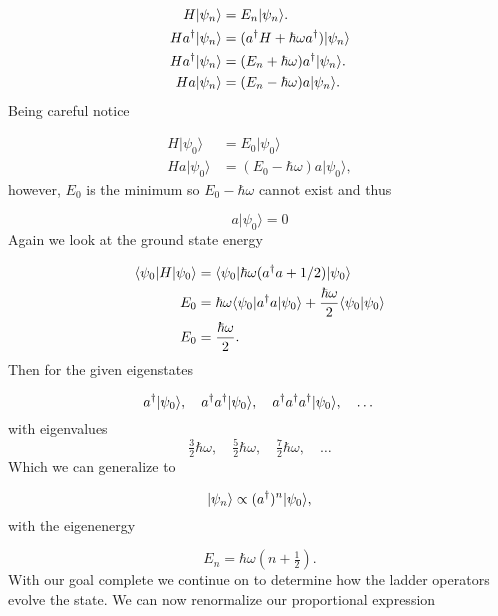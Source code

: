 \begin{align}
  H | \psi_n \rangle &= E_n | \psi_n \rangle. \nonumber \\
  Ha^{\dagger} | \psi_n \rangle &= (a^{\dagger} H + \hbar \omega a^{\dagger}) |\psi_n\rangle \nonumber \\
  Ha^{\dagger} | \psi_n \rangle &= (E_n +\hbar \omega) a^{\dagger} |\psi_n\rangle. \nonumber \\
  H a |\psi_n \rangle &= (E_n - \hbar \omega) a |\psi_n\rangle. \nonumber \\
\end{align}
Being careful notice

\begin{align}
  H|\psi_0\rangle &= E_0 |\psi_0\rangle \nonumber \\
  Ha|\psi_0\rangle &= (E_0-\hbar \omega) a|\psi_0\rangle,
\end{align}
however, $E_0$ is the minimum so $E_0-\hbar \omega$ cannot exist and thus

\begin{equation}
  a |\psi_0\rangle = 0
\end{equation}
Again we look at the ground state energy

\begin{align}
  \langle \psi_0 | H | \psi_0 \rangle &= \langle \psi_0 | \hbar \omega(a^{\dagger} a +1/2) | \psi_0 \rangle \nonumber \\
  E_0 &= \hbar \omega \langle \psi_0 | a^{\dagger} a | \psi_0 \rangle + \dfrac{\hbar\omega}{2} \langle \psi_0 | \psi_0 \rangle \nonumber \\
  E_0 &= \dfrac{\hbar \omega}{2}.
\end{align}
Then for the given eigenstates

\begin{equation*}
  a^{\dagger}|\psi_0\rangle, \quad a^{\dagger}a^{\dagger}|\psi_0\rangle, \quad a^{\dagger}a^{\dagger}a^{\dagger}|\psi_0\rangle, \quad \dots
\end{equation*}
with eigenvalues
\begin{equation*}
  \tfrac{3}{2} \hbar\omega, \quad \tfrac{5}{2} \hbar\omega, \quad \tfrac{7}{2} \hbar\omega, \quad \dots
\end{equation*}
Which we can generalize to

\begin{equation*}
  |\psi_n\rangle \propto ( a^{\dagger} )^n|\psi_0\rangle,
\end{equation*}
with the eigenenergy

\begin{equation*}
  E_n = \hbar\omega \left( n + \tfrac{1}{2} \right).
\end{equation*}
With our goal complete we continue on to determine how the ladder operators evolve the state.
We can now renormalize our proportional expression

